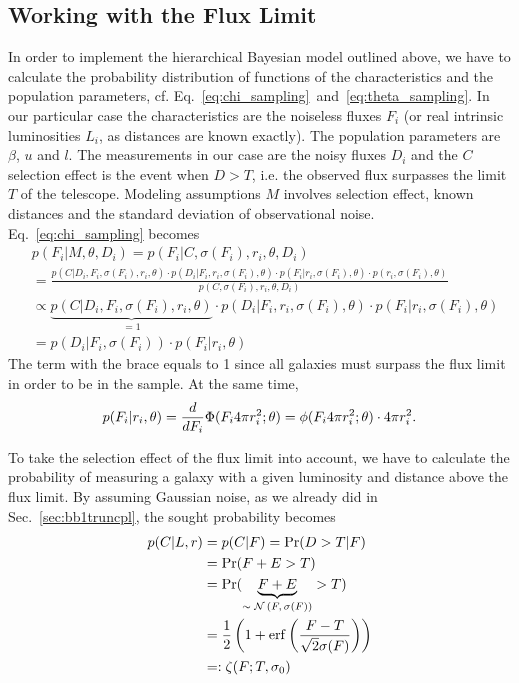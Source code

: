 \subsection{Working with the Flux Limit}
\label{sec:sel_effect}

In order to implement the hierarchical Bayesian model outlined above, we have to calculate the probability distribution of functions of the characteristics and the population parameters, cf. Eq.~\ref{eq:chi_sampling}~and~\ref{eq:theta_sampling}.
In our particular case the characteristics are the noiseless fluxes $F_i$ (or real intrinsic luminosities $L_i$, as distances are known exactly).
The population parameters are $\beta$, $u$ and $l$.
The measurements in our case are the noisy fluxes $D_i$ and the $C$ selection effect is the event when $D > T$, i.e. the observed flux surpasses the limit $T$ of the telescope.
Modeling assumptions $M$ involves selection effect, known distances and the standard deviation of observational noise.
Eq.~\ref{eq:chi_sampling} becomes
\begin{align}
& p(F_{i} | M, \theta, D_{i})=p(F_{i} | C, \sigma(F_{i}), r_{i}, \theta, D_{i})\\
& =\frac{p(C | D_{i}, F_{i}, \sigma(F_{i}), r_{i}, \theta)\cdot p(D_{i} | F_{i}, r_{i}, \sigma(F_{i}), \theta)\cdot p(F_{i} | r_{i}, \sigma(F_{i}), \theta)\cdot p(r_{i}, \sigma(F_{i}), \theta)}{p(C, \sigma(F_{i}), r_{i}, \theta, D_{i})}\\
& \propto \underbrace{p(C | D_{i}, F_{i}, \sigma(F_{i}), r_{i}, \theta)}_\text{$=1$}\cdot p(D_{i} | F_{i}, r_{i}, \sigma(F_{i}), \theta)\cdot p(F_{i} | r_{i}, \sigma(F_{i}), \theta)\label{eq:chi_est_one_prob}\\
& =p(D_{i} | F_{i}, \sigma(F_{i}))\cdot p(F_{i} | r_{i}, \theta)
\end{align}
The term with the brace equals to 1 since all galaxies must surpass the flux limit in order to be in the sample.
At the same time,
\begin{align}
\label{eq:chi_given_dist_theta} p(F_{i} | r_{i}, \theta) = \frac{d}{dF_{i}}\Phi(F_{i}4\pi r_{i}^{2} ; \theta) = \phi(F_{i}4\pi r_{i}^{2} ; \theta)\cdot 4\pi r_{i}^{2}.
\end{align}

To take the selection effect of the flux limit into account, we have to calculate the probability of measuring a galaxy with a given luminosity and distance above the flux limit.
By assuming Gaussian noise, as we already did in Sec.~\ref{sec:bb1truncpl}, the sought probability becomes
\begin{align}
p(C | L, r) &= p(C | F) = \Pr(D>T | F)\\
&= \Pr(F+E>T)\\
&=\Pr(\underbrace{F + E}_\text{$\sim \mathcal{N}\left(F,\sigma(F)\right)$} > T)\\
&=\frac{1}{2}\left( 1 + \operatorname{erf}\left( \frac{F - T}{\sqrt{2}\sigma(F)} \right) \right)\\
&=:\zeta(F ; T,\sigma_{0})
\label{eq:pclr}
\end{align}

